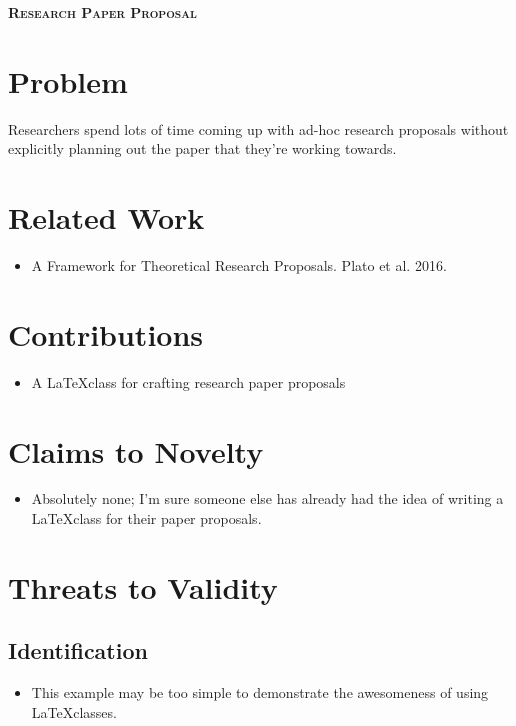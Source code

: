 \documentclass{paper_proposal}
\begin{document}

\begin{center}
\textsc{\LARGE\textbf{Research Paper Proposal}}
\end{center}

\vspace{1mm}

\section{Problem}
Researchers spend lots of time coming up with ad-hoc research proposals
without explicitly planning out the paper that they're working towards.

\section{Related Work}
\begin{itemize}
  \item A Framework for Theoretical Research Proposals. Plato et al. 2016.
\end{itemize}

\section{Contributions}
\begin{itemize}
  \item A \LaTeX class for crafting research paper proposals
\end{itemize}

%
\section{Claims to Novelty}
\begin{itemize}
  \item Absolutely none; I'm sure someone else has already had the idea of
    writing a \LaTeX class for their paper proposals.
\end{itemize}

\section{Threats to Validity}

\subsection{Identification}
\begin{itemize}
  \item This example may be too simple to demonstrate the awesomeness of using
    \LaTeX classes.
\end{itemize}
\end{document}
